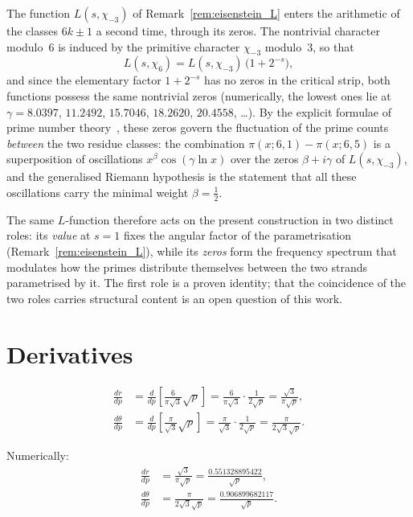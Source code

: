 \begin{remark}
\label{rem:L_two_roles}
The function $L(s,\chi_{-3})$ of Remark~\ref{rem:eisenstein_L} enters
the arithmetic of the classes $6k \pm 1$ a second time, through its
zeros. The nontrivial character modulo~$6$ is induced by the primitive
character $\chi_{-3}$ modulo~$3$, so that
\begin{equation}
  L(s,\chi_6) = L(s,\chi_{-3})\,\bigl(1 + 2^{-s}\bigr),
\end{equation}
and since the elementary factor $1 + 2^{-s}$ has no zeros in the
critical strip, both functions possess the same nontrivial zeros
(numerically, the lowest ones lie at $\gamma = 8.0397$, $11.2492$,
$15.7046$, $18.2620$, $20.4558$, \ldots).
By the explicit formulae of prime number theory~\cite{Davenport2000},
these zeros govern the fluctuation of the prime counts \emph{between}
the two residue classes: the combination
$\pi(x; 6, 1) - \pi(x; 6, 5)$ is a superposition of oscillations
$x^{\beta}\cos(\gamma \ln x)$ over the zeros $\beta + i\gamma$ of
$L(s,\chi_{-3})$, and the generalised Riemann hypothesis is the
statement that all these oscillations carry the minimal weight
$\beta = \tfrac12$.

The same $L$-function therefore acts on the present construction in
two distinct roles: its \emph{value} at $s = 1$ fixes the angular
factor of the parametrisation
(Remark~\ref{rem:eisenstein_L}), while its \emph{zeros} form the
frequency spectrum that modulates how the primes distribute themselves
between the two strands parametrised by it. The first role is a proven
identity; that the coincidence of the two roles carries structural
content is an open question of this work.
\end{remark}


\section{Derivatives}

\begin{theorem}
\begin{equation}
\begin{aligned}
\frac{dr}{dp}
  &= \frac{d}{dp}\left[\frac{6}{\pi\sqrt{3}}\sqrt{p}\right]
   = \frac{6}{\pi\sqrt{3}} \cdot \frac{1}{2\sqrt{p}}
   = \frac{\sqrt{3}}{\pi\sqrt{p}}, \\[10pt]
\frac{d\theta}{dp}
  &= \frac{d}{dp}\left[\frac{\pi}{\sqrt{3}}\sqrt{p}\right]
   = \frac{\pi}{\sqrt{3}} \cdot \frac{1}{2\sqrt{p}}
   = \frac{\pi}{2\sqrt{3}\sqrt{p}}.
\end{aligned}
\end{equation}
\end{theorem}

Numerically:
\begin{align}
\frac{dr}{dp} &= \frac{\sqrt{3}}{\pi\sqrt{p}} = \frac{0.551328895422}{\sqrt{p}}, \\[4pt]
\frac{d\theta}{dp} &= \frac{\pi}{2\sqrt{3}\sqrt{p}} = \frac{0.906899682117}{\sqrt{p}}.
\end{align}
